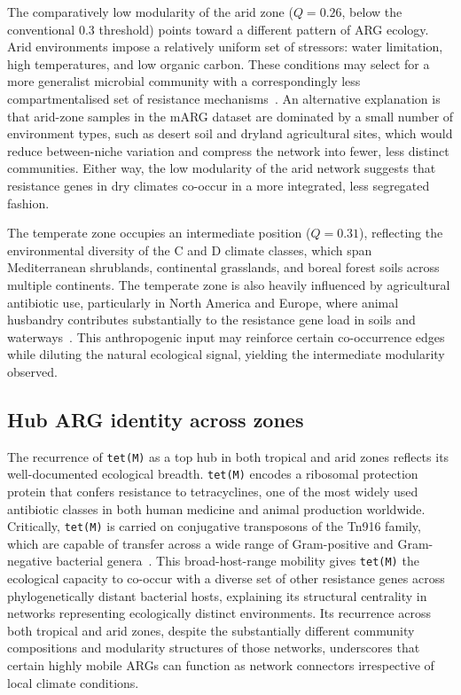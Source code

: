 \documentclass[12pt,a4paper]{article}
\begin{document}
The comparatively low modularity of the arid zone ($Q = 0.26$, below
the conventional 0.3 threshold) points toward a different pattern of
ARG ecology.
Arid environments impose a relatively uniform set of stressors:
water limitation, high temperatures, and low organic carbon.
These conditions may select for a more generalist microbial community
with a correspondingly less compartmentalised set of resistance
mechanisms~\cite{SalgueiroCernuda2024}.
An alternative explanation is that arid-zone samples in the mARG
dataset are dominated by a small number of environment types, such as
desert soil and dryland agricultural sites, which would reduce
between-niche variation and compress the network into fewer, less
distinct communities.
Either way, the low modularity of the arid network suggests that
resistance genes in dry climates co-occur in a more integrated,
less segregated fashion.

The temperate zone occupies an intermediate position ($Q = 0.31$),
reflecting the environmental diversity of the C and D climate classes,
which span Mediterranean shrublands, continental grasslands, and
boreal forest soils across multiple continents.
The temperate zone is also heavily influenced by agricultural antibiotic
use, particularly in North America and Europe, where animal husbandry
contributes substantially to the resistance gene load in soils and
waterways~\cite{vanBoeckel2014}.
This anthropogenic input may reinforce certain co-occurrence edges while
diluting the natural ecological signal, yielding the intermediate
modularity observed.


\subsection{Hub ARG identity across zones}

The recurrence of \texttt{tet(M)} as a top hub in both tropical and
arid zones reflects its well-documented ecological breadth.
\texttt{tet(M)} encodes a ribosomal protection protein that confers
resistance to tetracyclines, one of the most widely used antibiotic
classes in both human medicine and animal production worldwide.
Critically, \texttt{tet(M)} is carried on conjugative transposons of
the Tn916 family, which are capable of transfer across a wide range of
Gram-positive and Gram-negative bacterial genera~\cite{Roberts2011}.
This broad-host-range mobility gives \texttt{tet(M)} the ecological
capacity to co-occur with a diverse set of other resistance genes across
phylogenetically distant bacterial hosts, explaining its structural
centrality in networks representing ecologically distinct environments.
Its recurrence across both tropical and arid zones, despite the
substantially different community compositions and modularity structures
of those networks, underscores that certain highly mobile ARGs can
function as network connectors irrespective of local climate conditions.
\end{document}
